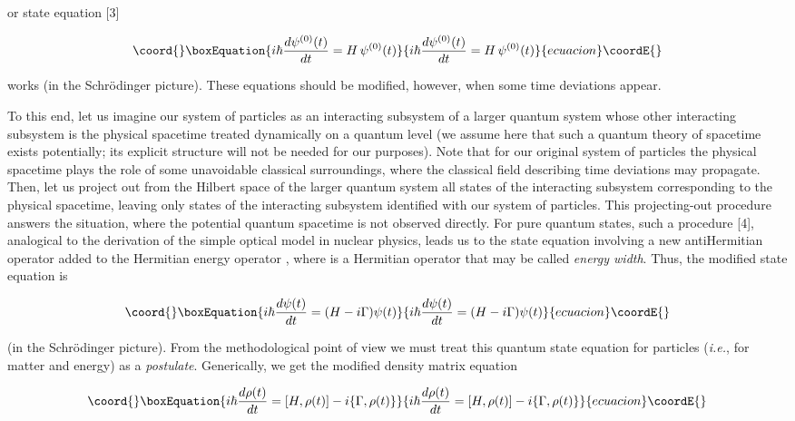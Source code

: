 \documentclass[a4paper,12pt]{article}
\begin{document}
\ni or state equation [3]

\begin{equation}\coord{}\boxEquation{
i \hbar \frac{d\psi^{(0)}(t)}{dt} = H\,\psi^{(0)}(t)
}{
i \hbar \frac{d\psi^{(0)}(t)}{dt} = H\,\psi^{(0)}(t)
}{ecuacion}\coordE{}\end{equation}

\ni works (in the Schr\"{o}dinger picture). These equations should be modified, however, when some time deviations appear.

To this end, let us imagine our system of particles as an interacting subsystem of a larger quantum system whose other interacting subsystem is the physical spacetime treated dynamically on a quantum level (we assume here that such a quantum theory of spacetime exists potentially; its explicit structure will not be needed for our purposes). Note that for our original system of particles the physical spacetime plays the role of some unavoidable classical surroundings, where the classical field \coordHE{} describing time deviations may propagate. Then, let us project out from the Hilbert space of the larger quantum system all states of the interacting subsystem  corresponding to the physical spacetime, leaving only states of the interacting subsystem identified with our system of particles. This projecting-out procedure answers the situation, where the potential quantum spacetime is not observed directly. For pure quantum states, such a procedure [4], analogical to the derivation of the simple optical model in nuclear physics, leads us to the state equation involving a new antiHermitian operator \coordHE{} added to the Hermitian energy operator \coordHE{}, where \myHighlight{$\Gamma$}\coordHE{} is a Hermitian operator that may be called {\it energy width}. Thus, the modified state equation is

\begin{equation}\coord{}\boxEquation{
i \hbar \frac{d\psi (t)}{dt} = (H - i\Gamma)\psi (t)
}{
i \hbar \frac{d\psi (t)}{dt} = (H - i\Gamma)\psi (t)
}{ecuacion}\coordE{}\end{equation}

\ni (in the Schr\"{o}dinger picture). From the methodological point of view we must treat this quantum state equation for particles ({\it i.e.}, for matter and energy) as a {\it postulate}. Generically, we get the modified density matrix equation

\begin{equation}\coord{}\boxEquation{
i \hbar \frac{d\rho(t)}{dt} = [H,\rho(t)] - i\{\Gamma,\rho(t)\}
}{
i \hbar \frac{d\rho(t)}{dt} = [H,\rho(t)] - i\{\Gamma,\rho(t)\}
}{ecuacion}\coordE{}\end{equation}
\end{document}
